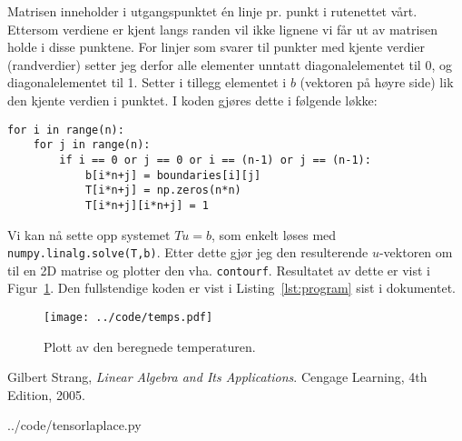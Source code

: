 Matrisen inneholder i utgangspunktet én linje pr. punkt i rutenettet vårt. Ettersom verdiene er kjent langs randen vil ikke lignene vi får ut av matrisen holde i disse punktene. For linjer som svarer til punkter med kjente verdier (randverdier) setter jeg derfor alle elementer unntatt diagonalelementet til 0, og diagonalelementet til 1. Setter i tillegg elementet i $b$ (vektoren på høyre side) lik den kjente verdien i punktet. I koden gjøres dette i følgende løkke:
\begin{lstlisting}
for i in range(n):
    for j in range(n):
        if i == 0 or j == 0 or i == (n-1) or j == (n-1):
            b[i*n+j] = boundaries[i][j]
            T[i*n+j] = np.zeros(n*n)
            T[i*n+j][i*n+j] = 1
\end{lstlisting}

Vi kan nå sette opp systemet $Tu=b$, som enkelt løses med \texttt{numpy.linalg.solve(T,b)}. Etter dette gjør jeg den resulterende $u$-vektoren om til en 2D matrise og plotter den vha. \texttt{contourf}. Resultatet av dette er vist i Figur~\ref{fig:temps}. Den fullstendige koden er vist i Listing~\ref{lst:program} sist i dokumentet.


\begin{figure}[htbp]
  \centering
  \texttt{[image: ../code/temps.pdf]}
  \caption{Plott av den beregnede temperaturen.}
  \label{fig:temps}
\end{figure}


\begin{thebibliography}{1}
    Gilbert Strang,
    \emph{Linear Algebra and Its Applications}.
    Cengage Learning,
    4th Edition,
    2005.

\end{thebibliography}


\clearpage

  {../code/tensorlaplace.py}



